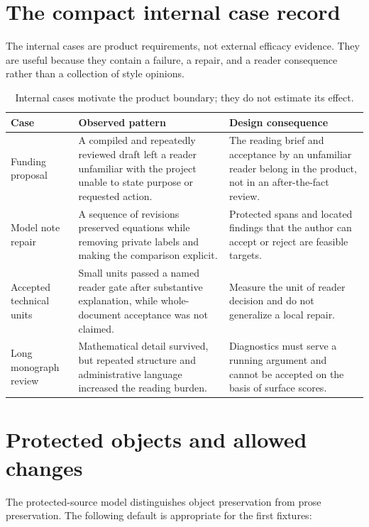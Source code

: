 \section{The compact internal case record}

The internal cases are product requirements, not external efficacy evidence.
They are useful because they contain a failure, a repair, and a reader
consequence rather than a collection of style opinions.

\begin{table}[H]
\centering
\small
\begin{tabularx}{\textwidth}{@{}p{}L p{0.28\textwidth}@{}}
\toprule
Case & Observed pattern & Design consequence \\
\midrule
Funding proposal & A compiled and repeatedly reviewed draft left a reader
unfamiliar with the project unable to state purpose or requested action. &
The reading brief and acceptance by an unfamiliar reader belong in the product,
not in an after-the-fact review. \\
Model note repair & A sequence of revisions preserved equations while removing
private labels and making the comparison explicit. & Protected spans and
located findings that the author can accept or reject are feasible targets. \\
Accepted technical units & Small units passed a named reader gate after
substantive explanation, while whole-document acceptance was not claimed. &
Measure the unit of reader decision and do not generalize a local repair. \\
Long monograph review & Mathematical detail survived, but repeated structure
and administrative language increased the reading burden. & Diagnostics must
serve a running argument and cannot be accepted on the basis of surface scores. \\
\bottomrule
\end{tabularx}
\caption{Internal cases motivate the product boundary; they do not estimate its
effect.}
\label{tab:internal-cases}
\end{table}

\section{Protected objects and allowed changes}

The protected-source model distinguishes object preservation from prose
preservation. The following default is appropriate for the first fixtures:

